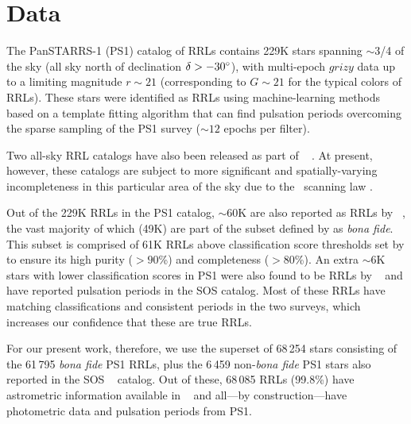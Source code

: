 \documentclass[twocolumn]{aastex63}
\begin{document}
\section{Data} \label{sec:data}

The PanSTARRS-1 (PS1) catalog of RRLs \citep{Sesar:2017b} contains 229K stars spanning $\sim$3/4 of the sky (all sky north of declination $\delta > -30\mbox{$^\circ$}$), with multi-epoch $grizy$ data up to a limiting magnitude $r\sim21$ (corresponding to $G \sim 21$ for the typical colors of RRLs). These stars were identified as RRLs using machine-learning methods based on a template fitting algorithm that can find pulsation periods overcoming the sparse sampling of the PS1 survey ($\sim12$ epochs per filter).

Two all-sky RRL catalogs have also been released as part of \Gaia~ \citep[VariClassifier and Specific Object Studies][]{Holl2018, Rimoldini2018, Clementini2018}. At present, however, these catalogs are subject to more significant and spatially-varying incompleteness in this particular area of the sky due to the \Gaia\ scanning law \citep[see][though many of these issues will improve with future \Gaia\ data releases]{Rimoldini2018}.

Out of the 229K RRLs in the PS1 catalog, $\sim60$K are also reported as RRLs by \Gaia~, the vast majority of which (49K) are part of the subset defined by \citet{Sesar:2017b} as \emph{bona fide}. This subset is comprised of 61K RRLs above classification score thresholds set by \citet{Sesar:2017b} to ensure its high purity ($>90$\%) and completeness ($>80$\%). An extra $\sim6$K stars with lower classification scores in PS1 were also found to be RRLs by \Gaia~ and have reported pulsation periods in the SOS catalog. Most of these RRLs have matching classifications and consistent periods in the two surveys, which increases our confidence that these are true RRLs.

For our present work, therefore, we use the superset of 68\,254 stars consisting of the 61\,795 \emph{bona fide} PS1 RRLs, plus the 6\,459 non-\emph{bona fide} PS1 stars also reported in the SOS \Gaia~ catalog. Out of these, 68\,085 RRLs (99.8\%) have astrometric information available in \Gaia~ and all---by construction---have photometric data and pulsation periods from PS1.
\end{document}
